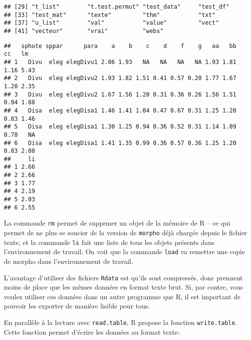 \begin{knitrout}
\begin{kframe}
\begin{verbatim}
## [29] "t_list"        "t.test.permut" "test_data"     "test_df"      
## [33] "test_mat"      "texte"         "thm"           "txt"          
## [37] "u_list"        "val"           "value"         "vect"         
## [41] "vecteur"       "vrai"          "webs"         
\end{verbatim}
\begin{flushleft}
\ttfamily\noindent
{}\hlkeyword{(}\hlkeyword{)}\mbox{}
\normalfont
\end{flushleft}
\begin{verbatim}
##   sphote sppar      para    a    b    c    d    f    g   aa   bb   cc   lm
## 1   Divu  eleg elegDivu1 2.06 1.93   NA   NA   NA   NA 1.93 1.81 1.16 5.43
## 2   Divu  eleg elegDivu2 1.93 1.82 1.51 0.41 0.57 0.20 1.77 1.67 1.20 2.35
## 3   Divu  eleg elegDivu2 1.67 1.56 1.20 0.31 0.36 0.26 1.56 1.51 0.94 1.88
## 4   Disa  eleg elegDisa1 1.46 1.41 1.04 0.47 0.67 0.31 1.25 1.20 0.83 1.46
## 5   Disa  eleg elegDisa1 1.30 1.25 0.94 0.36 0.52 0.31 1.14 1.09 0.78   NA
## 6   Disa  eleg elegDisa1 1.41 1.35 0.99 0.36 0.57 0.36 1.25 1.20 0.83 2.08
##     li
## 1 2.66
## 2 2.66
## 3 1.77
## 4 2.19
## 5 2.03
## 6 2.55
\end{verbatim}
\end{kframe}
\end{knitrout}


\noindent La commande \texttt{rm} permet de supprmer un objet de la mémoire de R -- ce qui permet de ne plus se soucier de la version de \texttt{morpho} déjà chargée depuis le fichier texte,
et la commande \texttt{ls} fait une liste de tous les objets présents dans l'environnement de travail.
On voit que la commande \texttt{load} va remettre une copie de morpho dans l'environnement de travail.

L'avantage d'utiliser des fichiers \texttt{Rdata} est qu'ils sont compressés, donc prennent moins de place que les mêmes données en format texte brut.
Si, par contre, vous voulez utiliser ces données dans un autre programme que R, il est important de pouvoir les exporter de manière lisible pour tous.

En parallèle à la lecture avec \texttt{read.table}, R propose la fonction \texttt{write.table}.
Cette fonction permet d'écrire les données au format texte:


